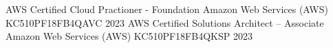 

\begin{cvhonors}

  \cvhonor
  {AWS Certified Cloud Practioner - Foundation} %
  {Amazon Web Services (AWS)} %
  {KC510PF18FB4QAVC} %
  {2023} %
  \cvhonor
  {AWS Certified Solutions Architect – Associate} %
  {Amazon Web Services (AWS)} %
  {KC510PF18FB4QKSP} %
  {2023} %
\end{cvhonors}
